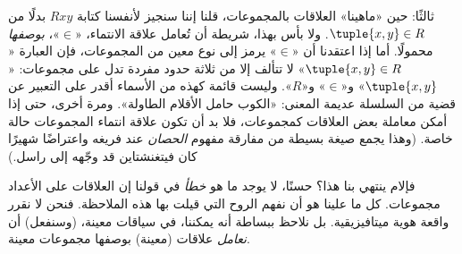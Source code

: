 \documentclass[../../../include/open-logic-section]{subfiles}
\begin{document}
ثالثًا: حين «ماهينا» العلاقات بالمجموعات، قلنا إننا سنجيز لأنفسنا كتابة
$Rxy$ بدلًا من $\tuple{x,y} \in R$. ولا بأس بهذا، شريطة أن تُعامل علاقة
الانتماء، «$\in$»، \emph{بوصفها} محمولًا. أما إذا اعتقدنا أن «$\in$» يرمز
إلى نوع معين من المجموعات، فإن العبارة «$\tuple{x,y} \in R$» لا تتألف إلا
من ثلاثة حدود مفردة تدل على مجموعات: «$\tuple{x,y}$» و«$\in$» و«$R$».
وليست قائمة كهذه من الأسماء أقدر على التعبير عن قضية من السلسلة عديمة
المعنى: «الكوب حامل الأقلام الطاولة». ومرة أخرى، حتى إذا
أمكن معاملة بعض العلاقات كمجموعات، فلا بد أن تكون علاقة انتماء المجموعات
حالة خاصة. (وهذا يجمع صيغة بسيطة من مفارقة مفهوم \emph{الحصان} عند فريغه
واعتراضًا شهيرًا كان فيتغنشتاين قد وجّهه إلى راسل.)

فإلام ينتهي بنا هذا؟ حسنًا، لا يوجد ما هو \emph{خطأ} في قولنا إن العلاقات
على الأعداد مجموعات. كل ما علينا هو أن نفهم الروح التي قيلت بها هذه
الملاحظة. فنحن لا نقرر واقعة هوية ميتافيزيقية. بل نلاحظ ببساطة أنه يمكننا،
في سياقات معينة، (وسنفعل) أن \emph{نعامل} علاقات (معينة) بوصفها مجموعات
معينة.
\end{document}
